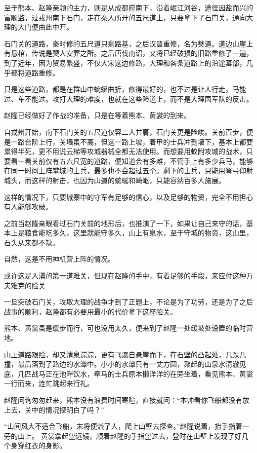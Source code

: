 至于熊本、赵隆亲领的主力，则是从成都府南下，沿着岷江河谷，途径因盐而兴的富顺监，过戎州南下石门，走在秦人所开的五尺道上，只要拿下了石门关，通向大理的大门便由此中开。

石门关的道路，秦时修的五尺道只剩路基，之后汉晋重修，名为僰道。道边山崖上有悬棺，传说是僰人安葬之所。之后唐伐南诏，又将已经破损的旧路重修了一遍，到了近年，因为贸易繁盛，不仅大宋这边修路，大理和各条道路上的沿途蕃部，几乎都将道路重修。

只是这些道路，都是在群山中蜿蜒曲折，修得最好的，也不过是让人行走，马能过、车不能过。攻打大理的难度，也就在这些险道上，而不是大理国军队的反击。

赵隆已经做好了作战的准备，只是在等着熊本、黄裳的到来。

自戎州开始，南下石门关的五尺道仅容二人并肩，石门关更是险峻。关前百步，便是一路台阶上行，关墙虽不高，但这一路上坡，着甲的士兵冲到墙下，基本上都要累得半死，更不用说云梯等攻城器械全都无法使用。而想要用蚁附攻城的战术，只要看一看关前仅有五六尺宽的道路，便知道会有多难，不管手上有多少兵马，能够在同一时间上阵攀城的士兵，最多也不会超过五个。剩下的士兵，只能用弩弓仰射城头，而这样的射击，也因为山道的蜿蜒和崎岖，只能容纳百多人施展。

这样的情况下，只要城寨中的守军有足够的信心，以及足够的物资，完全不用担心有人能够攻破。

之前当赵隆亲眼看过石门关前的地形后，也推演了一下，如果让自己来守的话，基本上是粮食能吃多久，这里就能守多久，山上有泉水，至于守城的物资，这山里，石头从来都不缺。

自然，这是不用神机营上阵的情况。

或许这是入滇的第一道难关，但现在赵隆的手中，有着足够的手段，来应付这种万夫难克的险关

一旦突破石门关，攻取大理的战争才到了正题上，不论是为了功劳，还是为了之后战事的顺利，赵隆都有必要用最小的代价拿下这座险关。

熊本、黄裳虽是缓步而行，可也没用太久，便来到了赵隆一处缓坡处设置的临时营地。

山上道路艰险，却又清泉淙淙，更有飞瀑自悬崖而下，在石壁的凸起处，几跌几撞，最后落到了路边的水潭中。小小的水潭只有一丈方圆，聚起的山泉水清澈见底，几匹战马正在池畔饮水，牵马的士兵原本懒洋洋的在旁坐着，看见熊本、黄裳一行而来，连忙跳起来行礼。

赵隆问询匆匆赶来，熊本没有浪费时间寒暄，直接就问：“本帅看你飞船都没有放上去，关中的情况探明白了吗？”

“山间风大不适合飞船，末将便派了人，爬上山壁去探查。”赵隆说着，抬手指着一旁的山上。
黄裳拿起望远镜，顺着赵隆的手指望过去，登时在山壁上发现了好几个身穿红衣的身影。

